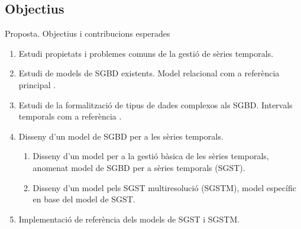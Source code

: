\subsection{Objectius}
\begin{frame}{Proposta. Objectius i contribucions esperades}


\begin{enumerate}

  \item Estudi  propietats i problemes comuns de la gestió de sèries temporals.

  \item Estudi de models de SGBD existents.  Model relacional com a
    referència principal \parencite{date:introduction,date06}.

  \item Estudi de la formalització de tipus de dades complexos als
    SGBD. Intervals temporals com a
    referència \parencite{date02:_tempor_data_relat_model}.

  \item Disseny d'un model de SGBD per a les sèries temporals. 

    \begin{enumerate}
    \item Disseny d'un model per a la gestió bàsica de les sèries
      temporals, anomenat model de SGBD per a sèries temporals (SGST).

    \item Disseny d'un model pels SGST multiresolució (SGSTM), model
      específic en base del model de SGST.
    \end{enumerate}

  \item Implementació de referència dels models de SGST i SGSTM. 

\end{enumerate}

\end{frame}




